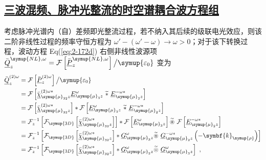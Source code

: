 \subsection{\protect\hyperlink{chap:\thesubsection}{三波混频、脉冲光整流的时空谱耦合波方程组}}
\label{三波混频、脉冲光整流的时空谱耦合波方程组}

考虑脉冲光谱内（自）差频即光整流过程，若不纳入其后续的级联电光效应，则该二阶非线性过程的频率守恒方程为 $ \omega' - \left( \omega'-\omega \right) \to \omega > 0$；对于该下转换过程，波动方程 Eq(\ref{eq:2-172d}) 右侧非线性波源项 $\bar{\underline{Q}}^{{\symup{NL}},\omega}_{z} = \mathcal F \left[ \bar{\underline{P}}^{{\symup{NL}},\omega}_z \right] \big/ {\symup{\varepsilon_0}}$ 变为
\begin{subequations} \label{eq:2-195}
	\abovedisplayskip=10pt
	\belowdisplayskip=10pt
	\begin{align}
		\bar{\underline{Q}}^{(2)\omega}_{z} &= \mathcal F \left[ \bar{\underline{P}}^{(2)\omega}_z \right] \big/ {\symup{\varepsilon_0}} \label{eq:2-195a} \\ &= \mathcal F \left[ \bar{\underline{\chi}}^{(2)\omega*}_{ {\symup{\mu}}_{32}z} \underline{E}^\omega_{{\symup{\mu}}_3 z}\ \widetilde *\ \underline{E}^{-\omega*}_{{\symup{\mu}}_2 z} \right] \label{eq:2-195b} \\ &= \mathcal F \left[ \bar{\underline{\chi}}^{(2)\omega*}_{ {\symup{\mu}}_{32}z} \right] * \mathcal F \left[ \underline{E}^\omega_{{\symup{\mu}}_3 z}\ \widetilde *\ \underline{E}^{-\omega*}_{{\symup{\mu}}_2 z} \right] \label{eq:2-195c} \\ &= \mathcal F^{-1}_{z} \left[ \mathcal F_{\symup{3D}} \left[ \bar{\underline{\chi}}^{(2)\omega*}_{ {\symup{\mu}}_{32}z} \right] \right] * \mathcal F \left[ \underline{E}^{\omega}_{{\symup{\mu}}_3 z} \right] \widetilde \circledast\ \mathcal F \left[ \underline{E}^{-\omega*}_{{\symup{\mu}}_2 z} \right] \label{eq:2-195d} \\ &= \mathcal F^{-1}_{z} \left[ \mathcal F_{\symup{3D}} \left[ \bar{\underline{\chi}}^{(2)\omega*}_{ {\symup{\mu}}_{32}z} \right] * \underline{G}^{\omega}_{{\symup{\mu}}_3 z} \widetilde \circledast\ \underline{G}^{-\omega*}_{{\symup{\mu}}_2 z} \left( - \symbf{k}_{\symup{\rho}} \right) \right] \label{eq:2-195e} \\ &= \mathcal F^{-1}_{z} \left[ \mathcal F_{\symup{3D}} \left[ \bar{\underline{\chi}}^{(2)\omega*}_{ {\symup{\mu}}_{32}z} \right] * \underline{G}^{\omega}_{{\symup{\mu}}_2 z} \widetilde \circledcirc\ \underline{G}^{\omega}_{{\symup{\mu}}_3 z} \right] \label{eq:2-195f}~,
	\end{align}
\end{subequations}
